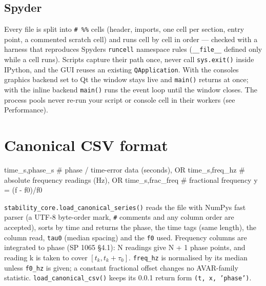 \documentclass[10pt,a4paper]{article}
\begin{document}

\hypertarget{spyder}{%
\subsection{Spyder}\label{spyder}}

Every file is split into \texttt{\# \%\%} cells (header, imports, one cell per section,
entry point, a commented scratch cell) and runs cell by cell in order ---
checked with a harness that reproduces Spyder\textquotesingle s \texttt{runcell} namespace rules
(\texttt{\_\allowbreak{}\_\allowbreak{}file\_\allowbreak{}\_} defined only while a cell runs). Scripts capture their path once,
never call \texttt{sys.\allowbreak{}exit()} inside IPython, and the GUI reuses an existing
\texttt{QApplication}. With the console\textquotesingle s graphics backend set to Qt the window stays
live and \texttt{main()} returns at once; with the inline backend \texttt{main()} runs the
event loop until the window closes. The process pools never re-run your
script or console cell in their workers (see Performance).


\hypertarget{canonical-csv-format}{%
\section{Canonical CSV format}\label{canonical-csv-format}}

\begin{codeblock}
time_s,phase_s        # phase / time-error data (seconds), OR
time_s,freq_hz        # absolute frequency readings (Hz), OR
time_s,frac_freq      # fractional frequency y = (f - f0)/f0
\end{codeblock}

\texttt{stability\_\allowbreak{}core.\allowbreak{}load\_\allowbreak{}canonical\_\allowbreak{}series()} reads the file with NumPy\textquotesingle s fast
parser (a UTF-8 byte-order mark, \texttt{\#} comments and any column order are
accepted), sorts by time and returns the phase, the time tags (same length),
the column read, \texttt{tau0} (median spacing) and the \texttt{f0} used. Frequency
columns are integrated to phase (SP 1065 §4.1): N readings give N + 1 phase
points, and reading k is taken to cover \([t_k, t_k+\tau_0]\). \texttt{freq\_\allowbreak{}hz} is
normalised by its median unless \texttt{f0\_\allowbreak{}hz} is given; a constant fractional
offset changes no AVAR-family statistic. \texttt{load\_\allowbreak{}canonical\_\allowbreak{}csv()} keeps its
0.0.1 return form \texttt{(t,\allowbreak{} x,\allowbreak{} 'phase')}.
\end{document}
